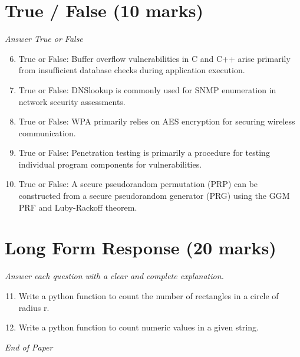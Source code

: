 \documentclass[12pt]{article}
\begin{document}
\section*{True / False (10 marks)}
\textit{Answer True or False}
\begin{enumerate}[label=\arabic*.]
\setcounter{enumi}{5}
\item True or False: Buffer overflow vulnerabilities in C and C++ arise primarily from insufficient database checks during application execution.
\item True or False: DNSlookup is commonly used for SNMP enumeration in network security assessments.
\item True or False: WPA primarily relies on AES encryption for securing wireless communication.
\item True or False: Penetration testing is primarily a procedure for testing individual program components for vulnerabilities.
\item True or False: A secure pseudorandom permutation (PRP) can be constructed from a secure pseudorandom generator (PRG) using the GGM PRF and Luby-Rackoff theorem.
\end{enumerate}

\section*{Long Form Response (20 marks)}
\textit{Answer each question with a clear and complete explanation.}
\begin{enumerate}[label=\arabic*.]
\setcounter{enumi}{10}
\item Write a python function to count the number of rectangles in a circle of radius r.
\item Write a python function to count numeric values in a given string.
\end{enumerate}

\vfill
\noindent\textit{End of Paper}
\end{document}
